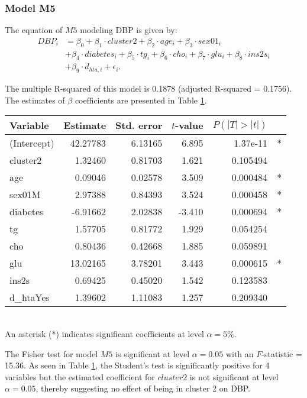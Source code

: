 \subsubsection{Model M5}
The equation of $M5$ modeling DBP is given by:
\begin{align*}
DBP_i &= \beta_0 + \beta_1 \cdot cluster2 + \beta_2 \cdot age_i + \beta_3 \cdot sex01_i  \\
& +\beta_4 \cdot diabetes_i +\beta_5 \cdot tg_i +\beta_6 \cdot cho_i +\beta_7 \cdot glu_i +\beta_8 \cdot ins2s_i \\
&+ \beta_9 \cdot d_{hta,i}+ \epsilon_i.
\end{align*}

The multiple R-squared of this model is 0.1878 (adjusted R-squared = 0.1756). The estimates of $\beta$ coefficients are presented in Table \ref{table:betasm5}.

\begin{table}
\centering
{}
\begin{tabular}{lrrrrl}
\toprule
Variable & Estimate & Std. error & $t$-value & $P(|T|>|t|)$ &\\
\midrule
(Intercept) &42.27783&    6.13165 &  6.895 &1.37e-11& *\\
cluster2    & 1.32460   & 0.81703&   1.621& 0.105494   & \\
age       &   0.09046  & 0.02578  & 3.509& 0.000484 &* \\
sex01M    &   2.97388 &   0.84393 &  3.524 &0.000458 &* \\
diabetes &   -6.91662   & 2.02838 & -3.410 &0.000694 &* \\
tg       &    1.57705  &  0.81772&   1.929& 0.054254 & \\
cho      &   0.80436 &   0.42668&   1.885& 0.059891 & \\
glu      &   13.02165  &  3.78201  & 3.443& 0.000615& * \\
ins2s     &   0.69425   & 0.45020 &  1.542& 0.123583  &  \\
d\_htaYes   &  1.39602   & 1.11083  & 1.257& 0.209340   &  \\
\bottomrule
\end{tabular}
\label{table:betasm5} \\
{\footnotesize An asterisk (*) indicates significant coefficients at level $\alpha=5\%$.}
\end{table}

The Fisher test for model $M5$ is significant at level $\alpha=0.05$ with an $F$-statistic = 15.36. As seen in Table \ref{table:betasm5}, the Student's test is significantly positive for 4 variables but the estimated coefficient for $cluster2$ is not significant at level $\alpha=0.05$, thereby suggesting no effect of being in cluster 2 on DBP.

